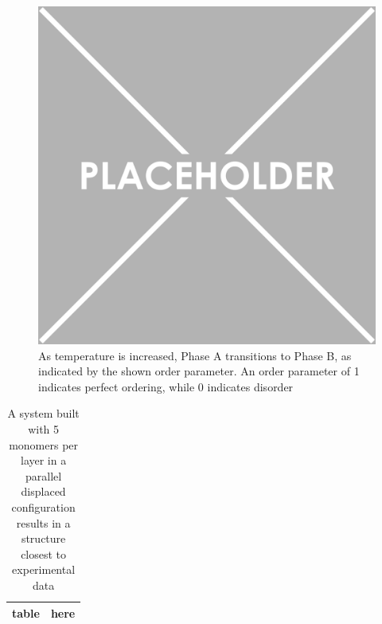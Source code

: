 \documentclass{article}
\begin{document}
	\begin{figure}
	\centering
	\includegraphics[width=\linewidth]{placeholder.png}
	\caption{As temperature is increased, Phase A transitions to Phase B, as indicated by the shown order parameter. An order parameter of 1 indicates perfect ordering, while 0 indicates disorder}\label{fig:transition}
	\end{figure}	

	\begin{table}
	\centering
	\begin{tabular}{|c|c|}
	\hline
	table & here \\
	\hline
	\end{tabular}
	\caption{A system built with 5 monomers per layer in a parallel displaced configuration results in a structure closest to experimental data}\label{table:p2p} 
	\end{table}
	
\end{document}
